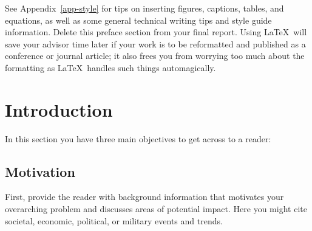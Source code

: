 \documentclass{wsecapstone}
\begin{document}
See Appendix~\ref{app-style} for tips on inserting figures, captions, tables, and equations, as well as some general technical writing tips and style guide information.  Delete this preface section from your final report. Using \LaTeX\ will save your advisor time later if your work is to be reformatted and published as a conference or journal article; it also frees you from worrying too much about the formatting as \LaTeX\ handles such things automagically. 




\section{Introduction}
In this section you have three main objectives to get across to a reader:  

\subsection{Motivation}
First, provide the reader with background information that motivates your overarching problem and discusses areas of potential impact.  Here you might cite societal, economic, political, or military events and trends.
\end{document}
